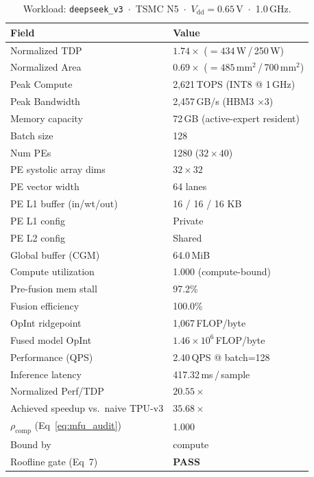 \begin{table}[h]
\centering
\caption{Workload: \texttt{deepseek\_v3}~$\cdot$~TSMC N5~$\cdot$~$V_\text{dd}=0.65$\,V~$\cdot$~1.0\,GHz.}
\label{tab:cheetah_v2_deepseek_v3}
\small\setlength{\tabcolsep}{6pt}
\begin{tabular}{@{}ll@{}}
\toprule
\textbf{Field} & \textbf{Value} \\
\midrule
Normalized TDP          & $1.74\times$ ($= 434$\,W\,/\,250\,W) \\
Normalized Area         & $0.69\times$ ($= 485$\,mm$^2$\,/\,700\,mm$^2$) \\
Peak Compute            & 2{,}621\,TOPS (INT8 @ 1\,GHz) \\
Peak Bandwidth          & 2{,}457\,GB/s (HBM3 $\times$3) \\
Memory capacity         & 72\,GB (active-expert resident) \\
Batch size              & 128 \\
Num PEs                 & 1280 ($32 \times 40$) \\
PE systolic array dims  & $32 \times 32$ \\
PE vector width         & 64 lanes \\
PE L1 buffer (in/wt/out) & 16 / 16 / 16 KB \\
PE L1 config            & Private \\
PE L2 config            & Shared \\
Global buffer (CGM)     & 64.0\,MiB \\
\midrule
Compute utilization     & 1.000 (compute-bound) \\
Pre-fusion mem stall    & 97.2\% \\
Fusion efficiency       & 100.0\% \\
OpInt ridgepoint        & 1{,}067\,FLOP/byte \\
Fused model OpInt       & $1.46 \times 10^{6}$\,FLOP/byte \\
Performance (QPS)       & 2.40\,QPS @ batch=128 \\
Inference latency       & 417.32\,ms\,/\,sample \\
Normalized Perf/TDP     & $20.55\times$ \\
Achieved speedup vs.\ naive TPU-v3 & $35.68\times$ \\
$\rho_{\mathrm{comp}}$ (Eq~\ref{eq:mfu_audit}) & 1.000 \\
Bound by                & compute \\
Roofline gate (Eq~7)    & \textcolor{green!60!black}{\textbf{PASS}} \\

\end{tabular}
\end{table}
